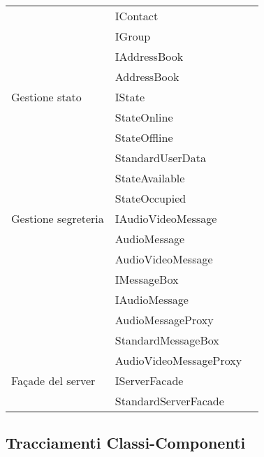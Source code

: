 \begin{center}
\begin{longtable}{lp{}l}
 & IContact \\
 & IGroup \\
 & IAddressBook \\
 & AddressBook \\
Gestione stato & IState \\
 & StateOnline \\
 & StateOffline \\
 & StandardUserData \\
 & StateAvailable \\
 & StateOccupied \\
Gestione segreteria & IAudioVideoMessage \\
 & AudioMessage \\
 & AudioVideoMessage \\
 & IMessageBox \\
 & IAudioMessage \\
 & AudioMessageProxy \\
 & StandardMessageBox \\
 & AudioVideoMessageProxy \\
Façade del server & IServerFacade \\
 & StandardServerFacade \\
\bottomrule
\end{longtable}
\end{center}
\subsection{Tracciamenti Classi-Componenti}

